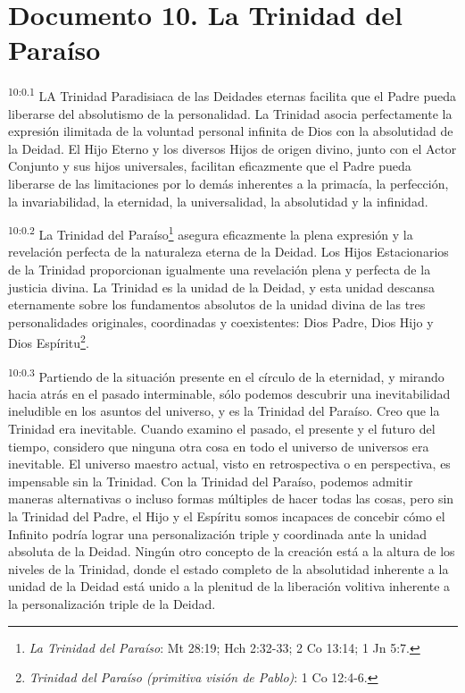 \chapter{Documento 10. La Trinidad del Paraíso}
\par
\textsuperscript{10:0.1} LA Trinidad Paradisiaca de las Deidades eternas facilita que el Padre pueda liberarse del absolutismo de la personalidad. La Trinidad asocia perfectamente la expresión ilimitada de la voluntad personal infinita de Dios con la absolutidad de la Deidad. El Hijo Eterno y los diversos Hijos de origen divino, junto con el Actor Conjunto y sus hijos universales, facilitan eficazmente que el Padre pueda liberarse de las limitaciones por lo demás inherentes a la primacía, la perfección, la invariabilidad, la eternidad, la universalidad, la absolutidad y la infinidad.

\par
\textsuperscript{10:0.2} La Trinidad del Paraíso\footnote{\textit{La Trinidad del Paraíso}: Mt 28:19; Hch 2:32-33; 2 Co 13:14; 1 Jn 5:7.} asegura eficazmente la plena expresión y la revelación perfecta de la naturaleza eterna de la Deidad. Los Hijos Estacionarios de la Trinidad proporcionan igualmente una revelación plena y perfecta de la justicia divina. La Trinidad es la unidad de la Deidad, y esta unidad descansa eternamente sobre los fundamentos absolutos de la unidad divina de las tres personalidades originales, coordinadas y coexistentes: Dios Padre, Dios Hijo y Dios Espíritu\footnote{\textit{Trinidad del Paraíso (primitiva visión de Pablo)}: 1 Co 12:4-6.}.

\par
\textsuperscript{10:0.3} Partiendo de la situación presente en el círculo de la eternidad, y mirando hacia atrás en el pasado interminable, sólo podemos descubrir una inevitabilidad ineludible en los asuntos del universo, y es la Trinidad del Paraíso. Creo que la Trinidad era inevitable. Cuando examino el pasado, el presente y el futuro del tiempo, considero que ninguna otra cosa en todo el universo de universos era inevitable. El universo maestro actual, visto en retrospectiva o en perspectiva, es impensable sin la Trinidad. Con la Trinidad del Paraíso, podemos admitir maneras alternativas o incluso formas múltiples de hacer todas las cosas, pero sin la Trinidad del Padre, el Hijo y el Espíritu somos incapaces de concebir cómo el Infinito podría lograr una personalización triple y coordinada ante la unidad absoluta de la Deidad. Ningún otro concepto de la creación está a la altura de los niveles de la Trinidad, donde el estado completo de la absolutidad inherente a la unidad de la Deidad está unido a la plenitud de la liberación volitiva inherente a la personalización triple de la Deidad.

